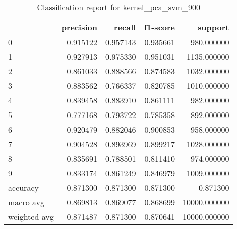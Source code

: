 \begin{table}[htb!]
\centering
\caption{Classification report for kernel_pca_svm_900}
\label{tab:classification-report-kernel_pca_svm_900}
\begin{tabular}{lrrrr}
\toprule
 & precision & recall & f1-score & support \\
\midrule
0 & 0.915122 & 0.957143 & 0.935661 & 980.000000 \\
1 & 0.927913 & 0.975330 & 0.951031 & 1135.000000 \\
2 & 0.861033 & 0.888566 & 0.874583 & 1032.000000 \\
3 & 0.883562 & 0.766337 & 0.820785 & 1010.000000 \\
4 & 0.839458 & 0.883910 & 0.861111 & 982.000000 \\
5 & 0.777168 & 0.793722 & 0.785358 & 892.000000 \\
6 & 0.920479 & 0.882046 & 0.900853 & 958.000000 \\
7 & 0.904528 & 0.893969 & 0.899217 & 1028.000000 \\
8 & 0.835691 & 0.788501 & 0.811410 & 974.000000 \\
9 & 0.833174 & 0.861249 & 0.846979 & 1009.000000 \\
accuracy & 0.871300 & 0.871300 & 0.871300 & 0.871300 \\
macro avg & 0.869813 & 0.869077 & 0.868699 & 10000.000000 \\
weighted avg & 0.871487 & 0.871300 & 0.870641 & 10000.000000 \\
\bottomrule
\end{tabular}
\end{table}
